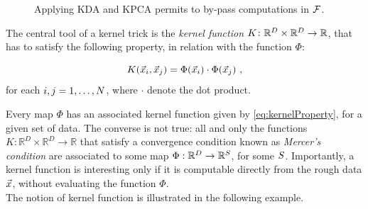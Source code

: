 \begin{figure}
\centering
{
}
\caption{Applying KDA and KPCA permits to by-pass computations in $\mathcal{F}$.}\label{fig:scheme2}
\end{figure}

The central tool of a kernel trick is the \emph{kernel function} $K \colon \mathbb{R}^D \times \mathbb{R}^D \rightarrow \mathbb{R}$, that has to satisfy the following property, in relation with the function $\Phi$:

\begin{equation}\label{eq:kernelProperty}
K(\vec{x}_i,\vec{x}_j) = \Phi(\vec{x}_i)\cdot \Phi(\vec{x}_j) \mbox{ ,}
\end{equation}
for each $i,j= 1,\dots, N$, where $\cdot$ denote the dot product.


Every map $\Phi$ has an associated kernel function given by \eqref{eq:kernelProperty}, for a given set of data. The converse is not true: all and only the functions $K\colon\mathbb{R}^D\times \mathbb{R}^D \rightarrow \mathbb{R}$ that satisfy a convergence condition known as {\em Mercer's condition} are associated to some map $\Phi:\mathbb{R}^D	\rightarrow \mathbb{R}^S$, for some $S$. Importantly, a kernel function is interesting only if it is computable directly from the rough data $\vec{x}$, without evaluating the function $\Phi$. \\

The notion of kernel function is illustrated in the following example.

